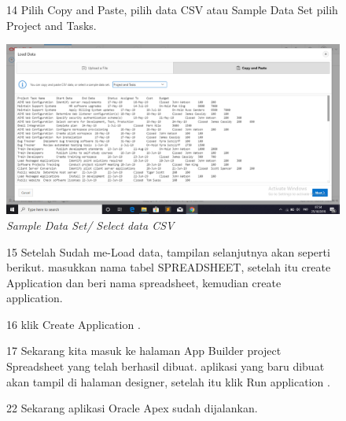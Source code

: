 \begin{enumerate}
\begin{figure}
\item[14] Pilih Copy and Paste, pilih data CSV atau Sample Data Set pilih Project and Tasks.

    \begin{center}
\includegraphics[scale=0.2]{apex/apex7.png}
    \caption{\textit{Sample Data Set/ Select data CSV}}
        \end{center}
\label{gambar}
\end{figure}

\begin{figure}
\item[15] Setelah Sudah me-Load data, tampilan selanjutnya akan seperti berikut. masukkan nama tabel {SPREADSHEET}, setelah itu create Application dan beri nama spreadsheet, kemudian create application.

\end{figure}

\begin{figure}
\item[16] klik Create Application .

\end{figure}


\begin{figure}
\item[17]Sekarang kita masuk ke halaman App Builder project Spreadsheet yang telah berhasil dibuat. aplikasi yang baru dibuat akan tampil di halaman designer, setelah itu klik Run application .
\end{figure}



\begin{figure}
\item[22]Sekarang aplikasi Oracle Apex sudah dijalankan.


\end{figure}
\end{enumerate}
